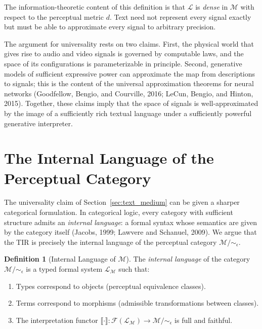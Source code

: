 \documentclass[11pt,a4paper]{article}
\theoremstyle{definition}
\newtheorem{definition}[theorem]{Definition}
\theoremstyle{remark}
\begin{document}
The information-theoretic content of this definition is that $\mathcal{L}$ is \emph{dense} in $\mathcal{M}$ with respect to the perceptual metric $d$. Text need not represent every signal exactly but must be able to approximate every signal to arbitrary precision.

The argument for universality rests on two claims. First, the physical world that gives rise to audio and video signals is governed by computable laws, and the space of its configurations is parameterizable in principle. Second, generative models of sufficient expressive power can approximate the map from descriptions to signals; this is the content of the universal approximation theorems for neural networks (Goodfellow, Bengio, and Courville, 2016; LeCun, Bengio, and Hinton, 2015). Together, these claims imply that the space of signals is well-approximated by the image of a sufficiently rich textual language under a sufficiently powerful generative interpreter.

\section{The Internal Language of the Perceptual Category}
\label{sec:internal_language}

The universality claim of Section~\ref{sec:text_medium} can be given a sharper categorical formulation. In categorical logic, every category with sufficient structure admits an \emph{internal language}: a formal syntax whose semantics are given by the category itself (Jacobs, 1999; Lawvere and Schanuel, 2009). We argue that the TIR is precisely the internal language of the perceptual category $\mathcal{M}/\!\sim_\epsilon$.

\begin{definition}[Internal Language of $\mathcal{M}$]
The \emph{internal language} of the category $\mathcal{M}/\!\sim_\epsilon$ is a typed formal system $\mathcal{L}_{\mathcal{M}}$ such that:
\begin{enumerate}[noitemsep]
\item Types correspond to objects (perceptual equivalence classes).
\item Terms correspond to morphisms (admissible transformations between classes).
\item The interpretation functor $\llbracket \cdot \rrbracket : \mathcal{F}(\mathcal{L}_{\mathcal{M}}) \rightarrow \mathcal{M}/\!\sim_\epsilon$ is full and faithful.
\end{enumerate}
\end{definition}
\end{document}

